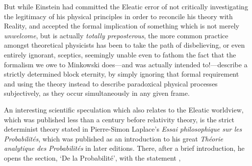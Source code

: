 But while Einstein had committed the Eleatic error of not critically investigating the legitimacy of his physical principles in order to reconcile his theory with Reality, and accepted the formal implication of something which is not merely \textit{unwelcome}, but is actually \textit{totally preposterous}, the more common practice amongst theoretical physicists has been to take the path of disbelieving, or even entirely ignorant, sceptics, seemingly unable even to fathom the fact that the formalism we owe to Minkowski does---and was actually intended to!---describe a strictly determined block eternity, by simply ignoring that formal requirement and using the theory instead to describe paradoxical physical processes subjectively, as they occur simultaneously in any given frame.

An interesting scientific speculation which also relates to the Eleatic worldview, which was published less than a century before relativity theory, is the strict determinist theory stated in Pierre-Simon Laplace's \textit{Essai philosophique sur les Probabilit\'{e}s}, which was published as an introduction to his great \textit{Th\'{e}orie analytique des Probabilit\'{e}s} in later editions. There, after a brief introduction, he opens the section, `De la Probabilit\'{e}', with the statement \cite{Laplace1951}, 
